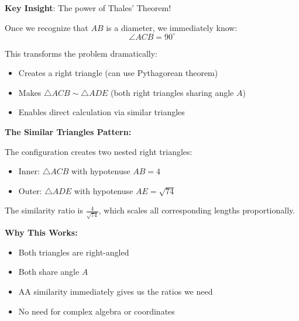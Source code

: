 \documentclass[]{article}
\begin{document}
\begin{keyinsightbox}
\textbf{Key Insight}: The power of Thales' Theorem!

Once we recognize that $AB$ is a diameter, we immediately know:
\[\angle ACB = 90^\circ\]

This transforms the problem dramatically:
\begin{itemize}
    \item Creates a right triangle (can use Pythagorean theorem)
    \item Makes $\triangle ACB \sim \triangle ADE$ (both right triangles sharing angle $A$)
    \item Enables direct calculation via similar triangles
\end{itemize}

\textbf{The Similar Triangles Pattern:}

The configuration creates two nested right triangles:
\begin{itemize}
    \item Inner: $\triangle ACB$ with hypotenuse $AB = 4$
    \item Outer: $\triangle ADE$ with hypotenuse $AE = \sqrt{74}$
\end{itemize}

The similarity ratio is $\frac{4}{\sqrt{74}}$, which scales all corresponding lengths proportionally.

\textbf{Why This Works:}
\begin{itemize}
    \item Both triangles are right-angled
    \item Both share angle $A$
    \item AA similarity immediately gives us the ratios we need
    \item No need for complex algebra or coordinates
\end{itemize}
\end{keyinsightbox}
\end{document}
